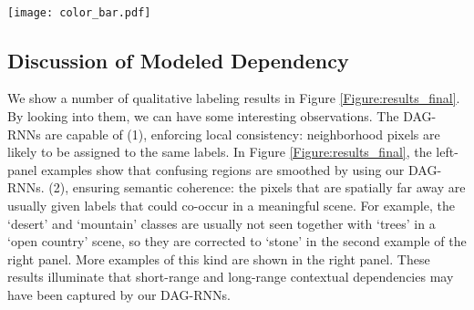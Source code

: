 \documentclass[10pt,twocolumn,letterpaper]{article}
\begin{document}
\begin{figure*}
\begin{center}
\hspace{0.03\textwidth}
\\

\vspace{-6pt}
\texttt{[image: color\_bar.pdf]}

\end{center}
\caption{Qualitative labeling results (best viewed in color). We show input images, local prediction maps (CNN-65-ENN), contextual labeling maps (CNN-65-DAG-RNN(8)) and their ground truth respectively. The numbers outside and inside the parentheses are global and class accuracy respectively. }
\label{Figure:results_final}
\end{figure*}

\subsection{Discussion of Modeled Dependency}
\vspace{-3pt}
We show a number of qualitative labeling results in Figure \ref{Figure:results_final}.
By looking into them, we can have some interesting observations. The DAG-RNNs are capable of (1), enforcing  local consistency: neighborhood pixels are likely to be assigned to the same labels. In Figure \ref{Figure:results_final}, the left-panel examples show that confusing regions are smoothed by using our DAG-RNNs. (2), ensuring semantic coherence: the pixels that are spatially far away  are usually given labels that could co-occur in a meaningful scene. For example, the `desert' and `mountain' classes are usually not seen together with `trees' in a `open country' scene, so they are corrected to `stone' in the second example of the right panel.  More examples of this kind are shown in the right panel. These results illuminate that short-range and long-range contextual dependencies may have been captured by our DAG-RNNs.
\end{document}
